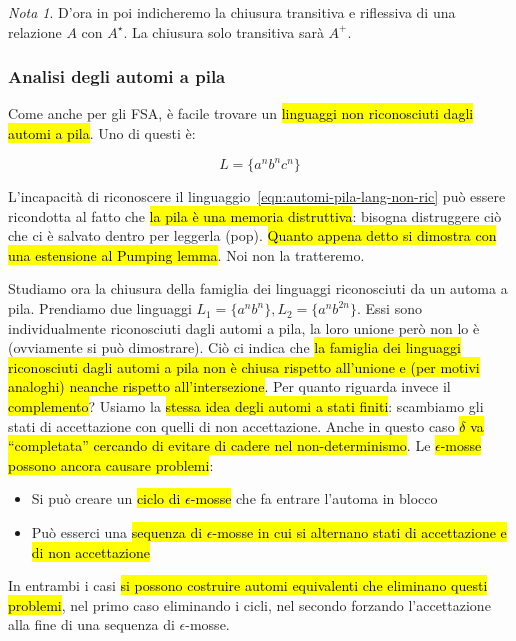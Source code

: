 \documentclass[a4paper,11pt,oneside]{article}
\theoremstyle{plain}
\theoremstyle{definition}
\theoremstyle{remark}
\newtheorem*{nota}{Nota}
\begin{document}
\begin{nota}
  D'ora in poi indicheremo la chiusura transitiva e riflessiva di una relazione
  $A$ con $A^\star$. La chiusura solo transitiva sarà $A^+$.
\end{nota}

\subsubsection{Analisi degli automi a pila}\label{sec:automi-pila-analisi}

Come anche per gli FSA, è facile trovare un \hl{linguaggi non riconosciuti dagli
automi a pila}. Uno di questi è:

\begin{equation}
  L = \{ a^n b^n c^n \}\label{eqn:automi-pila-lang-non-ric}
\end{equation}

L'incapacità di riconoscere il linguaggio~\ref{eqn:automi-pila-lang-non-ric} può
essere ricondotta al fatto che \hl{la pila è una memoria distruttiva}: bisogna
distruggere ciò che ci è salvato dentro per leggerla (pop). \hl{Quanto appena
detto si dimostra con una estensione al Pumping lemma}. Noi non la tratteremo.

Studiamo ora la chiusura della famiglia dei linguaggi riconosciuti da un automa
a pila. Prendiamo due linguaggi $L_1 = \{ a^n b^n \}, L_2 = \{ a^n b^{2n} \}$.
Essi sono individualmente riconosciuti dagli automi a pila, la loro unione però
non lo è (ovviamente si può dimostrare). Ciò ci indica che \hl{la famiglia dei
linguaggi riconosciuti dagli automi a pila non è chiusa rispetto all'unione e
(per motivi analoghi) neanche rispetto all'intersezione}. Per quanto riguarda
invece il \hl{complemento}? Usiamo la \hl{stessa idea degli automi a stati
finiti}: scambiamo gli stati di accettazione con quelli di non accettazione.
Anche in questo caso \hl{$\delta$ va ``completata'' cercando di evitare di
cadere nel non-determinismo}. Le \hl{$\epsilon$-mosse possono ancora causare
problemi}:

\begin{itemize}
  \item Si può creare un \hl{ciclo di $\epsilon$-mosse} che fa entrare l'automa
    in blocco
  \item Può esserci una \hl{sequenza di $\epsilon$-mosse in cui si alternano
    stati di accettazione e di non accettazione}
\end{itemize}

In entrambi i casi \hl{si possono costruire automi equivalenti che eliminano
questi problemi}, nel primo caso eliminando i cicli, nel secondo forzando
l'accettazione alla fine di una sequenza di $\epsilon$-mosse.
\end{document}
